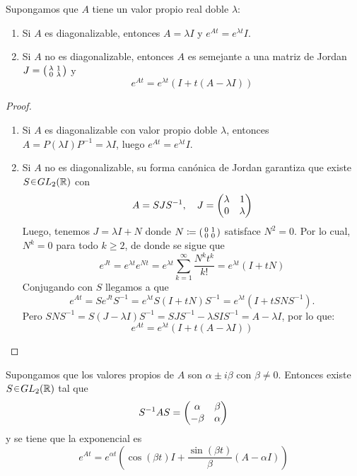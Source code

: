 \begin{teo}
\label{teo:doble}
Supongamos que $A$ tiene un valor propio real doble $\lambda$:
\begin{enumerate}[label = \roman*)]
\item Si $A$ es diagonalizable, entonces $A = \lambda I$ y $e^{At} = e^{\lambda t} I$.
\item Si $A$ no es diagonalizable, entonces $A$ es semejante a una matriz de Jordan $J = \smqty(\lambda & 1 \\ 0 & \lambda)$ y
\[
e^{At} = e^{\lambda t} \left( I + t(A - \lambda I) \right)
\]
\end{enumerate}
\end{teo}

\begin{proof}\hphantom{a}
\begin{enumerate}[label = \roman*)]
\item Si $A$ es diagonalizable con valor propio doble $\lambda$, entonces $A = P(\lambda I) P^{-1} = \lambda I$, luego $e^{At} = e^{\lambda t} I$.

\item Si $A$ no es diagonalizable, su forma canónica de Jordan garantiza que existe $S \en GL_2(\mathbb{R})$ con
\[
A = S J S^{-1}, \quad J = \mqty(\lambda & 1 \\ 0 & \lambda)
\]
Luego, tenemos $J = \lambda I + N$ donde $N \coloneq \smqty(0 & 1 \\ 0 & 0)$ satisface $N^2 = 0$. Por lo cual, $N^k = 0$ para todo $k \geq 2$, de donde se sigue que
\[
e^{Jt}%
= e^{\lambda t} e^{Nt}%
= e^{\lambda t}\sum^\infty_{k=1} \frac{N^kt^k}{k!}
= e^{\lambda t} (I + tN)
\]
Conjugando con $S$ llegamos a que
\[
e^{At} = S e^{Jt} S^{-1} = e^{\lambda t} S (I + tN) S^{-1} = e^{\lambda t} (I + t S N S^{-1}).
\]
Pero  $S N S^{-1} = S(J - \lambda I)S^{-1} = SJS^{-1} - \lambda SIS^{-1} = A - \lambda I$, por lo que:
\[
e^{At} = e^{\lambda t} \left( I + t(A - \lambda I) \right)
\]
\end{enumerate}
\end{proof}

\begin{teo}
\label{teo:complex}
Supongamos que los valores propios de $A$ son $\alpha \pm i\beta$ con $\beta \neq 0$. Entonces existe $S \en GL_2(\mathbb{R})$ tal que
\[
S^{-1} A S = \mqty(\alpha & \beta \\ -\beta & \alpha)
\]
y se tiene que la exponencial es
\[
e^{At} = e^{\alpha t} \left( \cos(\beta t) I + \frac{\sin(\beta t)}{\beta} (A - \alpha I) \right)
\]
\end{teo}

